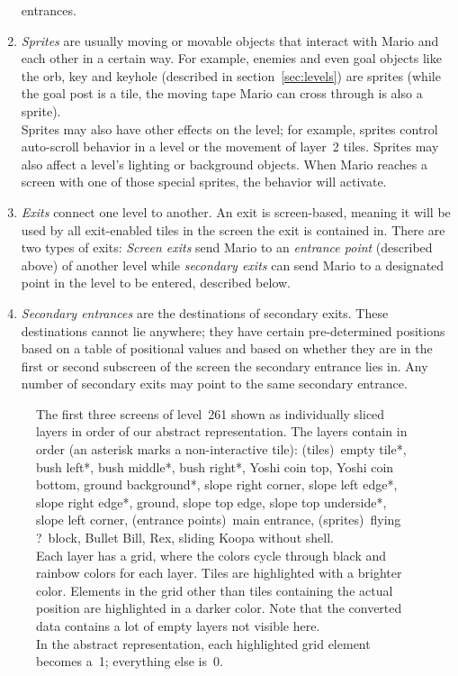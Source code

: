 \begin{enumerate}
  entrances.
\item \emph{Sprites} are usually moving or movable objects that
  interact with Mario and each other in a certain way. For example,
  enemies and even goal objects like the orb, key and keyhole
  (described in section~\ref{sec:levels}) are sprites (while the goal
  post is a tile, the moving tape Mario can cross through is also a
  sprite). \\
  Sprites may also have other effects on the level; for example,
  sprites control auto-scroll behavior in a level or the movement of
  layer~2 tiles. Sprites may also affect a level's lighting or
  background objects. When Mario reaches a screen with one of those
  special sprites, the behavior will activate.
\item \emph{Exits} connect one level to another. An exit is
  screen-based, meaning it will be used by all exit-enabled tiles in
  the screen the exit is contained in. There are two types of exits:
  \emph{Screen exits} send Mario to an \emph{entrance point}
  (described above) of another level while \emph{secondary exits} can
  send Mario to a designated point in the level to be entered,
  described below.
\item \emph{Secondary entrances} are the destinations of secondary
  exits. These destinations cannot lie anywhere; they have certain
  pre-determined positions based on a table of positional values and
  based on whether they are in the first or second subscreen of the
  screen the secondary entrance lies in. Any number of secondary exits
  may point to the same secondary entrance.
\end{enumerate}

\begin{figure}[p]
  \centering
  \caption{The first three screens of level~261 shown as individually
    sliced layers in order of our abstract representation. The layers
    contain in order (an asterisk marks a non-interactive tile):
    (tiles)~empty tile*, bush left*, bush middle*, bush right*, Yoshi
    coin top, Yoshi coin bottom, ground background*, slope right
    corner, slope left edge*, slope right edge*, ground, slope top
    edge, slope top underside*, slope left corner, (entrance
    points)~main entrance, (sprites)~flying ?~block, Bullet Bill, Rex,
    sliding Koopa without shell. \\
    \medskip
    Each layer has a grid, where the colors cycle through black and
    rainbow colors for each layer. Tiles are highlighted with a
    brighter color. Elements in the grid other than tiles containing
    the actual position are highlighted in a darker color. Note that
    the converted data contains a lot of empty layers not visible
    here. \\
    \medskip
    In the abstract representation, each highlighted grid element
    becomes a~1; everything else is~0.}
  \label{fig:sliced}
\end{figure}

